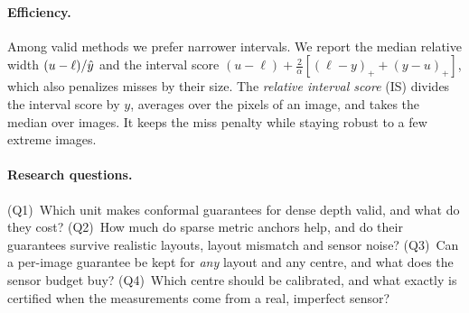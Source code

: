 \paragraph{Efficiency.}
Among valid methods we prefer narrower intervals.
We report the median relative width $(u-\ell)/\hat{y}$ and the interval score $(u-\ell)+\frac{2}{\alpha}[(\ell-y)_++(y-u)_+]$, which also penalizes misses by their size.
The \emph{relative interval score} (IS) divides the interval score by $y$, averages over the pixels of an image, and takes the median over images.
It keeps the miss penalty while staying robust to a few extreme images.

\paragraph{Research questions.}
(Q1)~Which unit makes conformal guarantees for dense depth valid, and what do they cost?
(Q2)~How much do sparse metric anchors help, and do their guarantees survive realistic layouts, layout mismatch and sensor noise?
(Q3)~Can a per-image guarantee be kept for \emph{any} layout and any centre, and what does the sensor budget buy?
(Q4)~Which centre should be calibrated, and what exactly is certified when the measurements come from a real, imperfect sensor?
